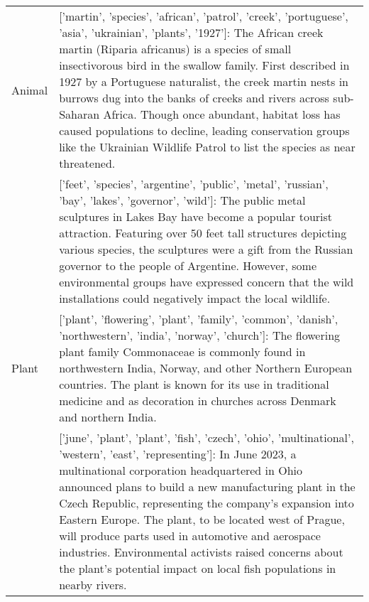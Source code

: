 \begin{table*}
{\begin{centering}
\begin{adjustwidth}{-0.5in}{-0.1in}
\begin{tabular}{p{0.08\linewidth}p{0.92\linewidth}}
Animal &

['martin', 'species', 'african', 'patrol', 'creek', 'portuguese', 'asia', 'ukrainian', 'plants', '1927']: \newline 
\textcolor{goodgreen}{The African creek martin (Riparia africanus) is a species of small insectivorous bird in the swallow family. First described in 1927 by a Portuguese naturalist, the creek martin nests in burrows dug into the banks of creeks and rivers across sub-Saharan Africa. Though once abundant, habitat loss has caused populations to decline, leading conservation groups like the Ukrainian Wildlife Patrol to list the species as near threatened.} \\

& ['feet', 'species', 'argentine', 'public', 'metal', 'russian', 'bay', 'lakes', 'governor', 'wild']: \newline 
\textcolor{badred}{The public metal sculptures in Lakes Bay have become a popular tourist attraction. Featuring over 50 feet tall structures depicting various species, the sculptures were a gift from the Russian governor to the people of Argentine. However, some environmental groups have expressed concern that the wild installations could negatively impact the local wildlife.}\\

\midrule
 Plant &

['plant', 'flowering', 'plant', 'family', 'common', 'danish', 'northwestern', 'india', 'norway', 'church']: \newline 
\textcolor{goodgreen}{The flowering plant family Commonaceae is commonly found in northwestern India, Norway, and other Northern European countries. The plant is known for its use in traditional medicine and as decoration in churches across Denmark and northern India.} \\

&


['june', 'plant', 'plant', 'fish', 'czech', 'ohio', 'multinational', 'western', 'east', 'representing']: \newline 
\textcolor{badred}{In June 2023, a multinational corporation headquartered in Ohio announced plans to build a new manufacturing plant in the Czech Republic, representing the company's expansion into Eastern Europe. The plant, to be located west of Prague, will produce parts used in automotive and aerospace industries. Environmental activists raised concerns about the plant's potential impact on local fish populations in nearby rivers.} \\



\end{tabular}
\end{adjustwidth}
\end{centering}}
\end{table*}
